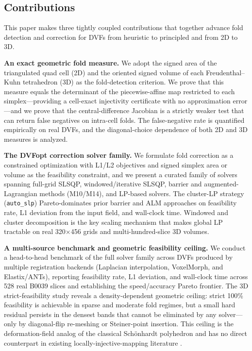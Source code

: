 \documentclass[lettersize,journal]{IEEEtran}
\begin{document}
\subsection{Contributions}
\label{sec:main_contributions}

This paper makes three tightly coupled contributions that together advance fold detection and correction for DVFs from heuristic to principled and from 2D to 3D.

\textbf{An exact geometric fold measure.} We adopt the signed area of the triangulated quad cell (2D) and the oriented signed volume of each Freudenthal--Kuhn tetrahedron (3D) as the fold-detection criterion. We prove that this measure equals the determinant of the piecewise-affine map restricted to each simplex---providing a cell-exact injectivity certificate with no approximation error---and we prove that the central-difference Jacobian is a strictly weaker test that can return false negatives on intra-cell folds. The false-negative rate is quantified empirically on real DVFs, and the diagonal-choice dependence of both 2D and 3D measures is analyzed.

\textbf{The DVFopt correction solver family.} We formulate fold correction as a constrained optimization with L1/L2 objectives and signed simplex area or volume as the feasibility constraint, and we present a curated family of solvers spanning full-grid SLSQP, windowed/iterative SLSQP, barrier and augmented-Lagrangian methods (M10/M14), and LP-based solvers. The cluster-LP strategy (\texttt{auto\_slp}) Pareto-dominates prior barrier and ALM approaches on feasibility rate, L1 deviation from the input field, and wall-clock time. Windowed and cluster decomposition is the key scaling mechanism that makes global LP tractable on real 320$\times$456 grids and multi-hundred-slice 3D volumes.

\textbf{A multi-source benchmark and geometric feasibility ceiling.} We conduct a head-to-head benchmark of the full solver family across DVFs produced by multiple registration backends (Laplacian interpolation, VoxelMorph, and Elastix/ANTs), reporting feasibility rate, L1 deviation, and wall-clock time across 528 real B0039 slices and establishing the speed/accuracy Pareto frontier. The 3D strict-feasibility study reveals a density-dependent geometric ceiling: strict 100\% feasibility is achievable in sparse and moderate fold regimes, but a small hard residual persists in the densest bands that cannot be eliminated by any solver---only by diagonal-flip re-meshing or Steiner-point insertion. This ceiling is the deformation-field analog of the classical Sch{\"o}nhardt polyhedron \cite{schonhardt1928} and has no direct counterpart in existing locally-injective-mapping literature \cite{schuller2013lim, garanzha2021foldfree}.
\end{document}
